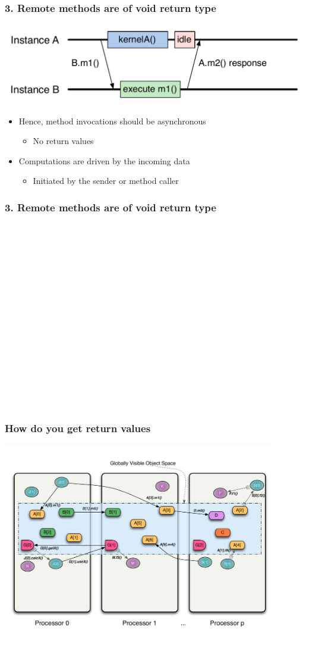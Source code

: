 \begin{frame}
\frametitle{3. Remote methods are of void return type}
  \begin{center}
    \includegraphics[width=\textwidth]{../figures/objectSequenceAsync.pdf}
  \end{center}
  \begin{itemize}
  \item Hence, method invocations should be asynchronous
    \begin{itemize}
    \item No return values
    \end{itemize}
  \item Computations are driven by the incoming data
    \begin{itemize}
    \item Initiated by the sender or method caller
    \end{itemize}
  \end{itemize}
\end{frame}


\begin{frame}
\frametitle{3. Remote methods are of void return type}
	\begin{center}
        \includegraphics<1>[width=0.9\textwidth]{../figures/progmodel/11-global-methods.pdf}
        \includegraphics<2>[width=0.9\textwidth]{../figures/progmodel/12-async-nonblock-rmi.pdf}
	\end{center}
\end{frame}


\begin{frame}
\frametitle{How do you get return values}
	\begin{center}
        \includegraphics[width=0.9\textwidth]{../figures/progmodel/13-rmi-return-values.pdf}
	\end{center}
\end{frame}


